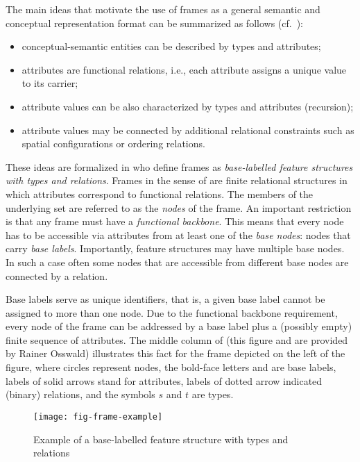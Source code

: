 The main ideas that motivate the use of frames as a general semantic and conceptual representation format can be summarized as follows (cf.\ \citealt{Loebner:2014}):
\begin{itemize}
\item conceptual-semantic entities can be described by types and
attributes;
\item attributes are functional relations, i.e., each attribute assigns a unique
value to its carrier;
\item attribute values can be also characterized by types and attributes (recursion);
\item attribute values may be connected by additional relational constraints \citep{Barsalou:92} such as spatial configurations or ordering relations.
\end{itemize}

These ideas are formalized in \citet{KallmeyerOsswald:13} who define frames
as \emph{base-labelled feature structures with types and relations}.
Frames in the sense of \citet{KallmeyerOsswald:13} are finite relational structures in which attributes correspond to functional relations. The members of the underlying set are referred to as the \emph{nodes} of the frame. An important restriction is that any frame must have a \emph{functional
backbone}. This means that every node has to be accessible via attributes
from at least one of the \emph{base nodes}: nodes that carry \emph{base labels}. Importantly, feature structures may have multiple base nodes. In such a case often some nodes that are accessible from different base nodes are connected by a relation.

Base labels serve as unique identifiers, that is, a given base label cannot be assigned to more than one node. Due to the functional backbone requirement, every node of the frame can be addressed by a base label
plus a (possibly empty) finite sequence of attributes.
The middle column of  (this figure and  are provided by Rainer Osswald) illustrates this fact
for the frame depicted on the left of the figure, where circles
represent nodes, the bold-face letters  and  are base
labels, labels of solid arrows stand for attributes, labels of dotted arrow
indicated (binary) relations, and the symbols $s$ and $t$ are types.
%
\begin{figure}
\hfill
\texttt{[image: fig-frame-example]}
\hfill
\caption{Example of a base-labelled feature structure with types and relations}
\label{fig-frame-example}
\end{figure}%
%

